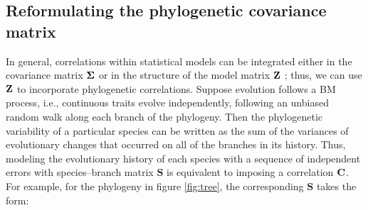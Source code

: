 \documentclass[12pt]{article}
\begin{document}
\subsection*{Reformulating the phylogenetic covariance matrix}

\newcommand{\bS}{{\mathbf S}}
\newcommand{\bJ}{{\mathbf J}}
\newcommand{\bB}{{\mathbf B}}
\newcommand{\bBadj}{{\mathbf B}_{\mbox{\tiny adj}}}
\newcommand{\bomega}{{\boldsymbol \omega}}
\newcommand{\bell}{{\boldsymbol \ell}}
\newcommand{\e}{{ \epsilon}}

In general, correlations within statistical models can be integrated either in the 
covariance matrix ${\boldsymbol \Sigma}$ or in the structure of the model matrix ${\mathbf Z}$ \citep{hefley2017basis};
thus, we can use ${\mathbf Z}$ to incorporate phylogenetic correlations.
Suppose evolution follows a BM process, i.e., continuous traits evolve independently, following an unbiased random walk along each branch of the phylogeny.
Then the phylogenetic variability of a particular species can be written as the sum of the variances of evolutionary changes that occurred on all of the branches in its history. 
Thus, modeling the evolutionary history of each species with a sequence of independent errors with species--branch matrix $\bS$ is equivalent to imposing a correlation ${\mathbf C}$.
For example, for the phylogeny in figure \ref{fig:tree}, the corresponding $\bS$ takes the form:
\end{document}
